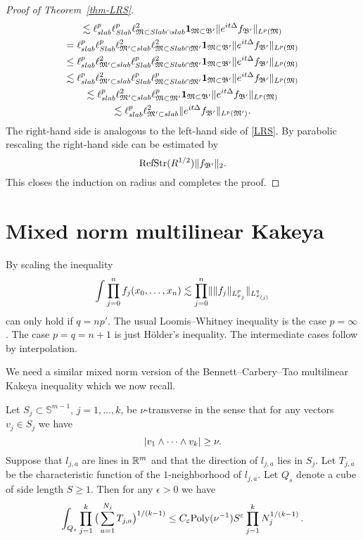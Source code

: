 \documentclass[biblatex]{pzorin-note}
\newcommand{\eit}{e^{i t \Delta}}
\newcommand{\bbS}{\mathbb{S}}
\newcommand{\RefStr}{\mathrm{RefStr}}
\newcommand{\bM}{\mathfrak{M}} %
\newcommand{\bBp}{\mathfrak{B}'} %
\newcommand{\bMp}{\mathfrak{M}'} %
\begin{document}
\begin{proof}[Proof of Theorem~\ref{thm-LRS}]
\begin{multline*}
\lesssim
\ell^{p}_{slab} \ell^{p}_{Slab} \ell^{2}_{\bM \subset Slab \cap slab} \one_{\bM \subset \bBp} \norm{ \eit f_{\bBp} }_{L^{p}(\bM)}\\
=
\ell^{p}_{slab} \ell^{p}_{Slab} \ell^{2}_{\bMp \subset slab} \ell^{2}_{\bM \subset Slab \cap \bMp} \one_{\bM \subset \bBp} \norm{ \eit f_{\bBp} }_{L^{p}(\bM)}\\
\leq
\ell^{p}_{slab} \ell^{2}_{\bMp \subset slab} \ell^{p}_{Slab} \ell^{2}_{\bM \subset Slab \cap \bMp} \one_{\bM \subset \bBp} \norm{ \eit f_{\bBp} }_{L^{p}(\bM)}\\
\lesssim
\ell^{p}_{slab} \ell^{2}_{\bMp \subset slab} \ell^{p}_{Slab} \ell^{p}_{\bM \subset Slab \cap \bMp} \one_{\bM \subset \bBp} \norm{ \eit f_{\bBp} }_{L^{p}(\bM)}\\
\lesssim
\ell^{p}_{slab} \ell^{2}_{\bMp \subset slab} \ell^{p}_{\bM \subset \bMp} \one_{\bM \subset \bBp} \norm{ \eit f_{\bBp} }_{L^{p}(\bM)}\\
\lesssim
\ell^{p}_{slab} \ell^{2}_{\bMp \subset slab} \norm{ \eit f_{\bBp} }_{L^{p}(\bMp)}.
\end{multline*}
The right-hand side is analogous to the left-hand side of \eqref{LRS}.
By parabolic rescaling the right-hand side can be estimated by
\[
\RefStr(R^{1/2}) \norm{f_{\bBp}}_{2}.
\]
This closes the induction on radius and completes the proof.
\end{proof}

\section{Mixed norm multilinear Kakeya}
By scaling the inequality
\[
\int \prod_{j=0}^{n} f_{j}(x_{0},\dotsc,x_{n})
\lesssim
\prod_{j=0}^{n} \norm{ \norm{f_{j}}_{L^{p}_{x_{j}}} }_{L^{q}_{x_{(j)}}}
\]
can only hold if $q=np'$.
The usual Loomis--Whitney inequality is the case $p=\infty$.
The case $p=q=n+1$ is just H\"older's inequality.
The intermediate cases follow by interpolation.

We need a similar mixed norm version of the Bennett--Carbery--Tao multilinear Kakeya inequality which we now recall.

\begin{theorem}[{\cite{MR2275834}}] \label{MK}
Let $S_j \subset \bbS^{m-1}$, $j=1,\dotsc,k$, be $\nu$-transverse in the sense that for any vectors $v_j\in S_j$ we have
\[
\abs{v_1\wedge \dotsb \wedge v_k} \geq \nu.
\]
Suppose that $l_{j,a}$ are lines in $\R^m$ and that the direction of $l_{j,a}$ lies in $S_j$.
Let $T_{j,a}$ be the characteristic function of the $1$-neighborhood of $l_{j,a}$.
Let $Q_s$ denote a cube of side length $S \geq 1$.
Then for any $\epsilon>0$ we have
\[
\int_{Q_s} \prod_{j=1}^{k} \big(\sum_{a=1}^{N_j} T_{j,a}\big)^{1/(k-1)} \leq C_\epsilon {\rm Poly}(\nu^{-1}) S^{\epsilon} \prod_{j=1}^{k} N_j^{1/(k-1)}\,.
\]
\end{theorem}
\end{document}
